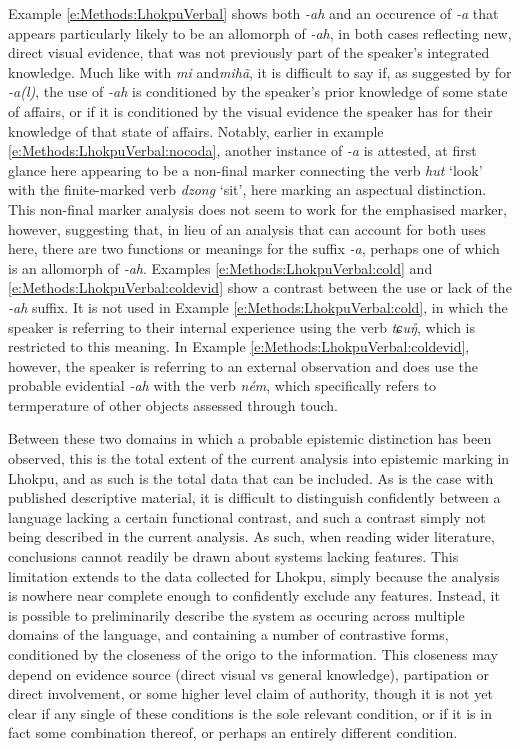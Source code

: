 Example \ref{e:Methods:LhokpuVerbal} shows both \textit{-ah} and an occurence of \textit{-a} that appears particularly likely to be an allomorph of \textit{-ah}, in both cases reflecting new, direct visual evidence, that was not previously part of the speaker's integrated knowledge. Much like with \textit{mi} and\textit{mihã}, it is difficult to say if, as suggested by  for \textit{-a(l)}, the use of \textit{-ah} is conditioned by the speaker's prior knowledge of some state of affairs, or if it is conditioned by the visual evidence the speaker has for their knowledge of that state of affairs. Notably, earlier in example \ref{e:Methods:LhokpuVerbal:nocoda}, another instance of \textit{-a} is attested, at first glance here appearing to be a non-final marker connecting the verb \textit{hut} `look' with the finite-marked verb \textit{dzong} `sit', here marking an aspectual distinction. This non-final marker analysis does not seem to work for the emphasised marker, however, suggesting that, in lieu of an analysis that can account for both uses here, there are two functions or meanings for the suffix \textit{-a}, perhaps one of which is an allomorph of \textit{-ah}. Examples \ref{e:Methods:LhokpuVerbal:cold} and \ref{e:Methods:LhokpuVerbal:coldevid} show a contrast between the use or lack of the \textit{-ah} suffix. It is not used in Example \ref{e:Methods:LhokpuVerbal:cold}, in which the speaker is referring to their internal experience using the verb \textit{tɕuŋ̊}, which is restricted to this meaning. In Example \ref{e:Methods:LhokpuVerbal:coldevid}, however, the speaker is referring to an external observation and does use the probable evidential \textit{-ah} with the verb \textit{ném}, which specifically refers to termperature of other objects assessed through touch.

Between these two domains in which a probable epistemic distinction has been observed, this is the total extent of the current analysis into epistemic marking in Lhokpu, and as such is the total data that can be included. As is the case with published descriptive material, it is difficult to distinguish confidently between a language lacking a certain functional contrast, and such a contrast simply not being described in the current analysis. As such, when reading wider literature, conclusions cannot readily be drawn about systems lacking features. This limitation extends to the data collected for Lhokpu, simply because the analysis is nowhere near complete enough to confidently exclude any features. Instead, it is possible to preliminarily describe the system as occuring across multiple domains of the language, and containing a number of contrastive forms, conditioned by the closeness of the origo to the information. This closeness may depend on evidence source (direct visual vs general knowledge), partipation or direct involvement, or some higher level claim of authority, though it is not yet clear if any single of these conditions is the sole relevant condition, or if it is in fact some combination thereof, or perhaps an entirely different condition.


